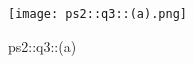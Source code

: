 \begin{answer}

\begin{figure}[H]
    \centering
    \texttt{[image: ps2::q3::(a).png]}
    \caption{ps2::q3::(a)}
    \label{fig:enter-label}
\end{figure}

\end{answer}
